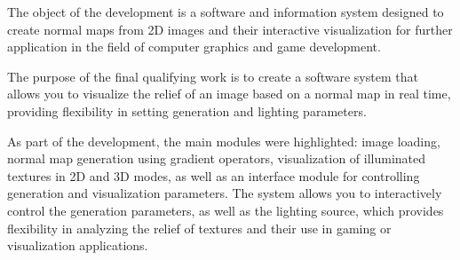 The object of the development is a software and information system designed to create normal maps from 2D images and their interactive visualization for further application in the field of computer graphics and game development.

The purpose of the final qualifying work is to create a software system that allows you to visualize the relief of an image based on a normal map in real time, providing flexibility in setting generation and lighting parameters.

As part of the development, the main modules were highlighted: image loading, normal map generation using gradient operators, visualization of illuminated textures in 2D and 3D modes, as well as an interface module for controlling generation and visualization parameters. The system allows you to interactively control the generation parameters, as well as the lighting source, which provides flexibility in analyzing the relief of textures and their use in gaming or visualization applications.
